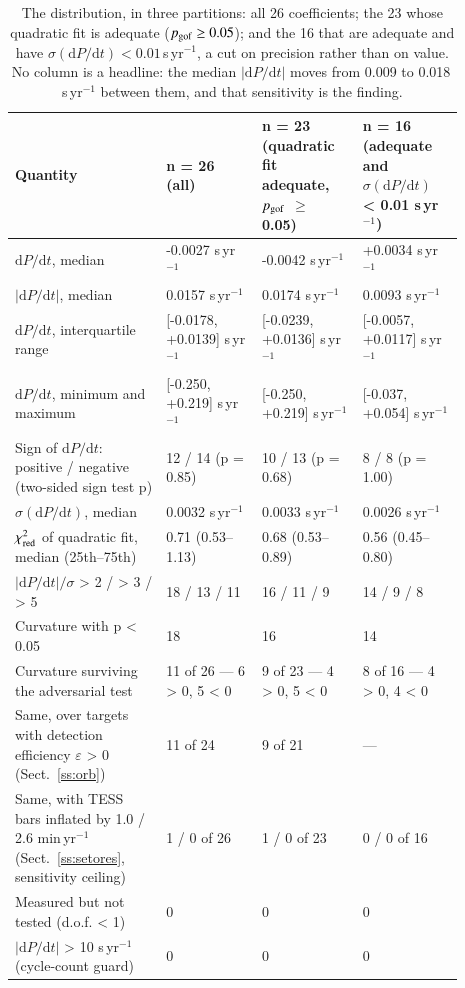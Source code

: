 \documentclass{aa}
\begin{document}
\begin{table}
\caption{The distribution, in three partitions: all 26 coefficients; the 23 whose quadratic fit is adequate ($p_{\rm gof}\ge0.05$); and the 16 that are adequate and have $\sigma(\mathrm{d}P/\mathrm{d}t)<0.01$\,s\,yr$^{-1}$, a cut on precision rather than on value. No column is a headline: the median $|\mathrm{d}P/\mathrm{d}t|$ moves from 0.009 to 0.018\,s\,yr$^{-1}$ between them, and that sensitivity is the finding.}
\label{t:dist}
\centering
\small
\begin{tabular}{p{0.30\linewidth} p{0.19\linewidth} p{0.20\linewidth} p{0.20\linewidth}}
\hline\hline
Quantity & n = 26 (all) & n = 23 (quadratic fit adequate, $p_{\rm gof}$ $\ge$ 0.05) & n = 16 (adequate and $\sigma(\mathrm{d}P/\mathrm{d}t)$ < 0.01 s\,yr$^{-1}$)\\
\hline
$\mathrm{d}P/\mathrm{d}t$, median & -0.0027 s\,yr$^{-1}$ & -0.0042 s\,yr$^{-1}$ & +0.0034 s\,yr$^{-1}$\\
$|\mathrm{d}P/\mathrm{d}t|$, median & 0.0157 s\,yr$^{-1}$ & 0.0174 s\,yr$^{-1}$ & 0.0093 s\,yr$^{-1}$\\
$\mathrm{d}P/\mathrm{d}t$, interquartile range & [-0.0178, +0.0139] s\,yr$^{-1}$ & [-0.0239, +0.0136] s\,yr$^{-1}$ & [-0.0057, +0.0117] s\,yr$^{-1}$\\
$\mathrm{d}P/\mathrm{d}t$, minimum and maximum & [-0.250, +0.219] s\,yr$^{-1}$ & [-0.250, +0.219] s\,yr$^{-1}$ & [-0.037, +0.054] s\,yr$^{-1}$\\
Sign of $\mathrm{d}P/\mathrm{d}t$: positive / negative (two-sided sign test p) & 12 / 14 (p = 0.85) & 10 / 13 (p = 0.68) & 8 / 8 (p = 1.00)\\
$\sigma(\mathrm{d}P/\mathrm{d}t)$, median & 0.0032 s\,yr$^{-1}$ & 0.0033 s\,yr$^{-1}$ & 0.0026 s\,yr$^{-1}$\\
$\chi^2_{\rm red}$ of quadratic fit, median (25th--75th) & 0.71 (0.53--1.13) & 0.68 (0.53--0.89) & 0.56 (0.45--0.80)\\
$|\mathrm{d}P/\mathrm{d}t|/\sigma$ > 2 / > 3 / > 5 & 18 / 13 / 11 & 16 / 11 / 9 & 14 / 9 / 8\\
Curvature with p < 0.05 & 18 & 16 & 14\\
Curvature surviving the adversarial test & 11 of 26 --- 6 > 0, 5 < 0 & 9 of 23 --- 4 > 0, 5 < 0 & 8 of 16 --- 4 > 0, 4 < 0\\
Same, over targets with detection efficiency $\varepsilon$ > 0 (Sect.~\ref{ss:orb}) & 11 of 24 & 9 of 21 & ---\\
Same, with TESS bars inflated by 1.0 / 2.6 min\,yr$^{-1}$ (Sect.~\ref{ss:setores}, sensitivity ceiling) & 1 / 0 of 26 & 1 / 0 of 23 & 0 / 0 of 16\\
Measured but not tested (d.o.f. < 1) & 0 & 0 & 0\\
$|\mathrm{d}P/\mathrm{d}t|$ > 10 s\,yr$^{-1}$ (cycle-count guard) & 0 & 0 & 0\\
\hline
\end{tabular}
\end{table}
\end{document}
